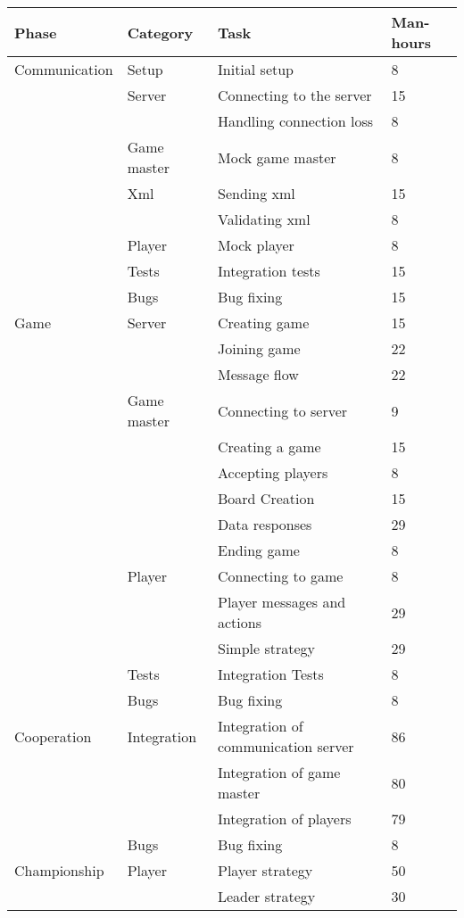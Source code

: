 \documentclass[11pt,a4paper]{article}
\begin{document}
\begin{tabular}{| p{3.5cm} | p{3cm} | p{4cm} | l |} \hline
\textbf{Phase} & \textbf{Category} & \textbf{Task} & \textbf{Man-hours} \\ \hline
Communication & Setup & Initial setup  & 8 \\ \cline{2-4}
& Server & Connecting to the server & 15 \\ \cline{3-4}
& & Handling connection loss & 8 \\ \cline{2-4}
& Game master & Mock game master & 8 \\ \cline{2-4}
& Xml & Sending xml & 15 \\ \cline{3-4}
& & Validating xml & 8 \\ \cline{2-4}
& Player & Mock player & 8 \\ \cline{2-4}
& Tests & Integration tests & 15 \\ \cline{2-4}
& Bugs & Bug fixing & 15 \\ \hline
Game & Server & Creating game & 15 \\ \cline{3-4}
& & Joining game & 22 \\ \cline{3-4}
& & Message flow & 22 \\ \cline{2-4}
& Game master & Connecting to server & 9 \\ \cline{3-4}
& & Creating a game & 15 \\ \cline{3-4}
& & Accepting players & 8 \\ \cline{3-4}
& & Board Creation & 15 \\ \cline{3-4}
& & Data responses & 29 \\ \cline{3-4}
& & Ending game & 8 \\ \cline{2-4}
& Player & Connecting to game & 8 \\ \cline{3-4}
& & Player messages and actions & 29 \\ \cline{3-4}
& & Simple strategy & 29 \\ \cline{2-4}
& Tests & Integration Tests & 8 \\ \cline{2-4}
& Bugs & Bug fixing & 8 \\ \hline
Cooperation & Integration & Integration of communication server & 86 \\ \cline{3-4}
& & Integration of game master & 80 \\ \cline{3-4}
& & Integration of players & 79 \\ \cline{2-4}
& Bugs & Bug fixing & 8 \\ \hline
Championship & Player & Player strategy & 50 \\ \cline{3-4}
& & Leader strategy & 30 \\ \hline
\end{tabular}
\end{document}
